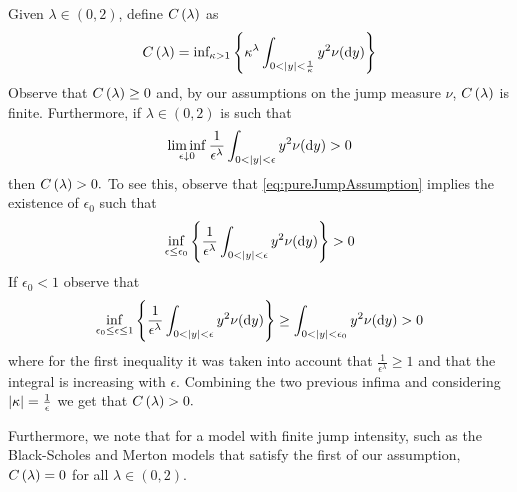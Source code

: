 \documentclass[11pt]{amsart}
\begin{document}
Given $\lambda \in (0,2)$, define $C \left( {\lambda} \right)$ as
\begin{equation}
\label{eq:PureJumpC}
\cl  = 
\textrm{inf}_{\kappa > 1} \left\{\kappa^{\lambda} 
 \int_{0<|y| < \frac{1}{\kappa}} y^2 \nu(\d y)\right\}
\end{equation}
Observe that $C \left( {\lambda} \right)\geq 0$ and, by our assumptions on the jump measure $\nu$, $C \left( {\lambda} \right)$ is finite. Furthermore, if $\lambda \in (0,2)$ is such
that
\begin{equation}
\label{eq:pureJumpAssumption}
\liminf_{\epsilon \downarrow 0} \frac{1}{\epsilon^{\lambda}}
 \int_{0<|y| < \epsilon} y^2 \nu(\d y) > 0
\end{equation}
then $C \left( {\lambda} \right)>0.$ To see this, observe that \eqref{eq:pureJumpAssumption} implies the existence of $\epsilon_0$ such that 
\begin{equation*}
\inf_{\epsilon \leq \epsilon_0}\left\{ \frac{1}{\epsilon^{\lambda}}
 \int_{0<|y| < \epsilon} y^2 \nu(\d y)\right\} > 0
\end{equation*}
If $\epsilon_0<1$ observe that
\begin{equation*}
\inf_{\epsilon_0 \leq \epsilon \leq 1}\left\{ \frac{1}{\epsilon^{\lambda}}
 \int_{0<|y| < \epsilon} y^2 \nu(\d y)\right\} \geq  \int_{0<|y| < \epsilon_0} y^2 \nu(\d y) > 0
\end{equation*}
where for the first inequality it was taken into account that $\frac{1}{\epsilon^{\lambda}}\geq 1$ and that the integral is increasing with $\epsilon$.
Combining the two previous infima and considering $\left| {\kappa} \right|=\frac{1}{\epsilon}$ we get that $C \left( {\lambda} \right)>0.$

Furthermore, we note that for a \levy model with finite jump
intensity, such as the Black-Scholes and Merton models that satisfy the first of our
assumption, $C \left( {\lambda} \right)=0$ for all $\lambda \in (0,2)$.
\end{document}

